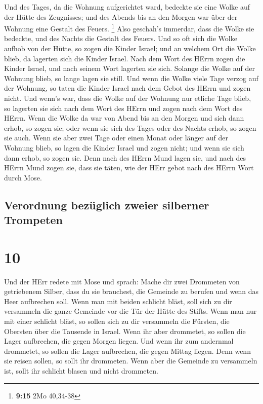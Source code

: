  Und des Tages, da die Wohnung aufgerichtet ward,
bedeckte sie eine Wolke auf der Hütte des Zeugnisses; und des Abends bis
an den Morgen war über der Wohnung eine Gestalt des Feuers. \footnote{\textbf{9:15}
  2Mo 40,34-38}  Also geschah's immerdar, dass die Wolke
sie bedeckte, und des Nachts die Gestalt des Feuers.  Und
so oft sich die Wolke aufhob von der Hütte, so zogen die Kinder Israel;
und an welchem Ort die Wolke blieb, da lagerten sich die Kinder Israel.
 Nach dem Wort des HErrn zogen die Kinder Israel, und
nach seinem Wort lagerten sie sich. Solange die Wolke auf der Wohnung
blieb, so lange lagen sie still.  Und wenn die Wolke
viele Tage verzog auf der Wohnung, so taten die Kinder Israel nach dem
Gebot des HErrn und zogen nicht.  Und wenn's war, dass
die Wolke auf der Wohnung nur etliche Tage blieb, so lagerten sie sich
nach dem Wort des HErrn und zogen nach dem Wort des HErrn.
 Wenn die Wolke da war von Abend bis an den Morgen und
sich dann erhob, so zogen sie; oder wenn sie sich des Tages oder des
Nachts erhob, so zogen sie auch.  Wenn sie aber zwei Tage
oder einen Monat oder länger auf der Wohnung blieb, so lagen die Kinder
Israel und zogen nicht; und wenn sie sich dann erhob, so zogen sie.
 Denn nach des HErrn Mund lagen sie, und nach des HErrn
Mund zogen sie, dass sie täten, wie der HErr gebot nach des HErrn Wort
durch Mose.

\hypertarget{verordnung-bezuxfcglich-zweier-silberner-trompeten}{%
\subsection{Verordnung bezüglich zweier silberner
Trompeten}\label{verordnung-bezuxfcglich-zweier-silberner-trompeten}}

\hypertarget{section-9}{%
\section{10}\label{section-9}}

 Und der HErr redete mit Mose und sprach: 
Mache dir zwei Drommeten von getriebenem Silber, dass du sie brauchest,
die Gemeinde zu berufen und wenn das Heer aufbrechen soll.
 Wenn man mit beiden schlicht bläst, soll sich zu dir
versammeln die ganze Gemeinde vor die Tür der Hütte des Stifts.
 Wenn man nur mit einer schlicht bläst, so sollen sich zu
dir versammeln die Fürsten, die Obersten über die Tausende in Israel.
 Wenn ihr aber drommetet, so sollen die Lager aufbrechen,
die gegen Morgen liegen.  Und wenn ihr zum andernmal
drommetet, so sollen die Lager aufbrechen, die gegen Mittag liegen. Denn
wenn sie reisen sollen, so sollt ihr drommeten.  Wenn aber
die Gemeinde zu versammeln ist, sollt ihr schlicht blasen und nicht
drommeten.

